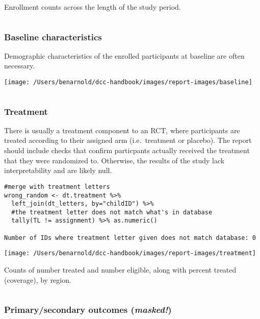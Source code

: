 \documentclass[
]{book}
\begin{document}
Enrollment counts across the length of the study period.

\(~\)

\hypertarget{baseline-characteristics}{%
\subsubsection{Baseline characteristics}\label{baseline-characteristics}}

Demographic characteristics of the enrolled participants at baseline are often necessary.

\texttt{[image: /Users/benarnold/dcc-handbook/images/report-images/baseline]}

\(~\)

\hypertarget{treatment}{%
\subsubsection{Treatment}\label{treatment}}

There is usually a treatment component to an RCT, where participants are treated according to their assigned arm (i.e.~treatment or placebo). The report should include checks that confirm particpants actually received the treatment that they were randomized to. Otherwise, the results of the study lack interpretability and are likely null.

\begin{verbatim}
#merge with treatment letters
wrong_random <- dt.treatment %>%
  left_join(dt_letters, by="childID") %>%
  #the treatment letter does not match what's in database
  tally(TL != assignment) %>% as.numeric()

Number of IDs where treatment letter given does not match database: 0
\end{verbatim}

\texttt{[image: /Users/benarnold/dcc-handbook/images/report-images/treatment]}

Counts of number treated and number eligible, along with percent treated (coverage), by region.

\(~\)

\hypertarget{primarysecondary-outcomes-masked}{%
\subsubsection{\texorpdfstring{Primary/secondary outcomes (\textbf{\emph{masked!}})}{Primary/secondary outcomes (masked!)}}\label{primarysecondary-outcomes-masked}}
\end{document}
